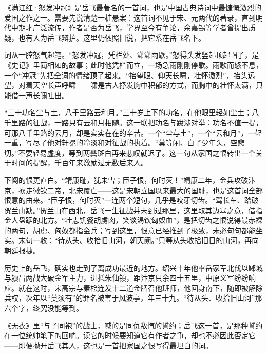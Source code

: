 \begin{appreciation}
《满江红·怒发冲冠》是岳飞最著名的一首词，也是中国古典诗词中最慷慨激烈的爱国之作之一。需要先说清楚一桩悬案：这首词不见于宋、元两代的著录，直到明代中期才广泛流传，作者是否为岳飞，学界至今有争论，余嘉锡等学者曾提出质疑，也有人为岳飞辩护。这里仍依照旧说，把它系在岳飞名下。

词从一腔怒气起笔。“怒发冲冠，凭栏处、潇潇雨歇。”怒得头发竖起顶起帽子，是《史记》里蔺相如的故事；此时他凭栏而立，一场急雨刚刚停歇。雨歇而怒不息，一个“冲冠”先把全词的情绪顶了起来。“抬望眼、仰天长啸，壮怀激烈”，抬头远望，对着天空长声呼啸——啸是古人抒发胸中积郁的方式，而胸中的壮怀太满，只能借一声长啸吐出。

“三十功名尘与土，八千里路云和月。”三十岁上下的功名，在他眼里轻如尘土；八千里路的征战，一路只有云和月相随。这一联把功名与跋涉对举：功名不值一提，可那八千里路的云月，却是实实在在的辛苦。一个“尘与土”，一个“云和月”，一轻一重，写尽了他对轩冕的冷淡和对征战的执着。“莫等闲、白了少年头，空悲切。”不要轻易虚度，等到两鬓斑白再来悲叹就迟了。这一句从家国之恨转出一个关于时间的提醒，千百年来激励过无数后来人。

下阕的恨更直白。“靖康耻，犹未雪；臣子恨，何时灭！”靖康二年，金兵攻破汴京，掳走徽钦二帝，北宋覆亡——这是宋朝立国以来最大的国耻，也是这首词全部恨意的由来。“臣子恨，何时灭”一连两个短句，几乎是咬牙切齿。“驾长车、踏破贺兰山缺。”贺兰山在西北，岳飞一生征战并未到过那里，这里取其边塞之意，借指金人盘踞的北方。“壮志饥餐胡虏肉，笑谈渴饮匈奴血”，是把切齿之恨说得最赤裸的两句，胡虏、匈奴都指金兵；写到这里，恨意已经推到了极致，未必句句都能坐实。末句一收：“待从头、收拾旧山河，朝天阙。”只等从头收拾旧日的山河，再向朝廷报捷。

历史上的岳飞，确实也走到了离成功最近的地方。绍兴十年他率岳家军北伐以郾城与颍昌两战大破金军主力，进抵朱仙镇，距汴京只余四十五里，中原义军纷纷响应。就在这时，宋高宗与秦桧连发十二道金牌召他班师，他回身南下，随即被解除兵权，次年以“莫须有”的罪名被害于风波亭，年三十九。“待从头、收拾旧山河”那六个字，终究没能等到。

《无衣》里“与子同袍”的战士，喊的是同仇敌忾的誓约；岳飞这一首，是那种誓约在一位统帅笔下的回响。读它的时候要知道它有作者之争，却也不必因此否定它——即便抛开岳飞其人，这也是一首把家国之恨写得最坦白的词。
\end{appreciation}
